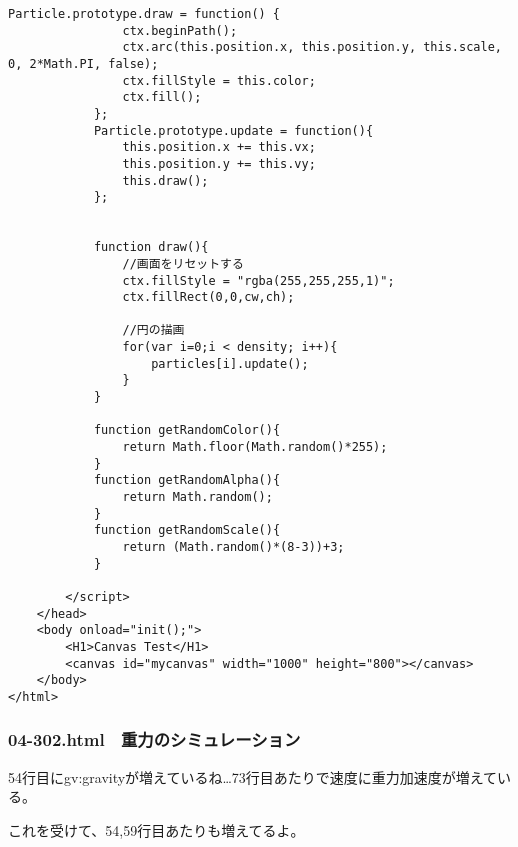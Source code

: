 \documentclass[mingoth,11pt,a4j,uplatex]{jsarticle}
\begin{document}
\begin{lstlisting}[caption=一定の方向に等加速度運動]
			Particle.prototype.draw = function() {
				ctx.beginPath();
				ctx.arc(this.position.x, this.position.y, this.scale, 0, 2*Math.PI, false);
				ctx.fillStyle = this.color;
				ctx.fill();
			};
			Particle.prototype.update = function(){
				this.position.x += this.vx;
				this.position.y += this.vy;
				this.draw();
			};
			
			
			function draw(){
				//画面をリセットする
				ctx.fillStyle = "rgba(255,255,255,1)";
				ctx.fillRect(0,0,cw,ch);
				
				//円の描画
				for(var i=0;i < density; i++){
					particles[i].update();
				}
			}

			function getRandomColor(){
				return Math.floor(Math.random()*255);
			}
			function getRandomAlpha(){
				return Math.random();
			}
			function getRandomScale(){
				return (Math.random()*(8-3))+3;
			}
			
		</script>
	</head>
	<body onload="init();">
		<H1>Canvas Test</H1>
		<canvas id="mycanvas" width="1000" height="800"></canvas>
	</body>
</html>
\end{lstlisting}

\subsubsection{04-302.html　重力のシミュレーション}
54行目にgv:gravityが増えているね…73行目あたりで速度に重力加速度が増えている。

これを受けて、54,59行目あたりも増えてるよ。
\end{document}
